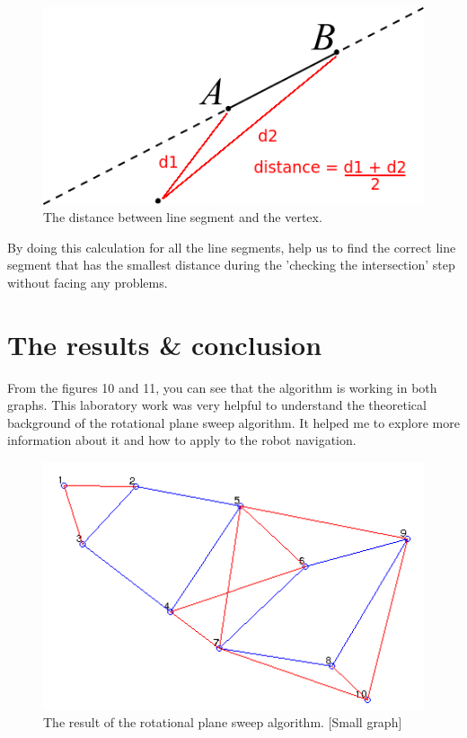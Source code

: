 \documentclass{article}
\begin{document}
\begin{figure}[!h]
\begin{center}
\includegraphics[scale=1.5]{06}
\caption{The distance between line segment and the vertex.}
\end{center}
\end{figure}

By doing this calculation for all the line segments, help us to find the correct line segment that has the smallest distance during the 'checking the intersection' step without facing any problems.





\section{The results \& conclusion}

From the figures 10 and 11, you can see that the algorithm is working in both graphs. This laboratory work was very helpful to understand the theoretical background of the rotational plane sweep algorithm. It helped me to explore more information about it and how to apply to the robot navigation.

\begin{figure}[!h]
\begin{center}
\includegraphics[scale=1.0]{07}
\caption{The result of the rotational plane sweep algorithm. [Small graph]}
\end{center}
\end{figure}
\end{document}

